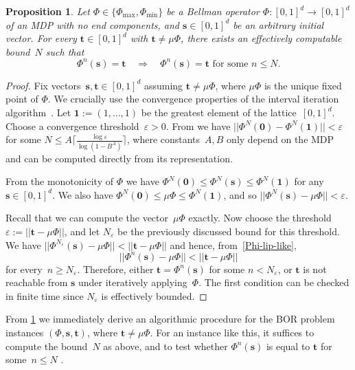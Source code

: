 \documentclass[preprint,12pt]{elsarticle}
\theoremstyle{plain}
\newtheorem{proposition}[theorem]{Proposition}
\theoremstyle{definition}
\theoremstyle{remark}
\theoremstyle{claimstyle}
\begin{document}
\begin{proposition}\label{t-not-fp}
	Let $\Phi \in \{\Phi_{\max}, \Phi_{\min}\}$
	be a Bellman operator
	$\Phi : [0, 1]^d\rightarrow [0, 1]^d$
	of an MDP with no end components, and $\bm{s} \in [0,1]^d$ be an arbitrary initial vector.
	For every $\bm{t} \in [0,1]^d$ with $\bm{t} \neq \mu\Phi$, 
	there exists an effectively computable bound~$N$ such that
	\[\Phi^n(\bm{s}) = \bm{t} \quad \Rightarrow \quad \Phi^n(\bm{s}) = \bm{t} \text{ for some } n\leq N.\]
\end{proposition}
\begin{proof}
	Fix vectors~$\bm{s}, \bm{t} \in [0,1]^d$ assuming $\bm{t} \neq \mu\Phi$, where $\mu\Phi$ is the unique fixed point of $\Phi$.
	We crucially use the convergence properties of the interval iteration algorithm~\cite{HaddadM18}.
	Let $\bm{1}:= (1, \dots, 1)$ be the greatest element of the lattice~$[0, 1]^d$. 
	Choose a convergence threshold~$\varepsilon > 0$.
	From \cite[Theorem~2]{HaddadM18} we have $||\Phi^N(\bm{0}) - \Phi^N(\bm{1})|| < \varepsilon$ for some $N \leq A \lceil \frac{\log{\varepsilon}}{\log(1-B^A)} \rceil$,
	where constants~$A, B$ only depend on the MDP and can be computed directly from its representation.
	
	From the monotonicity of $\Phi$ we have $\Phi^N(\bm{0}) \leq \Phi^N(\bm{s}) \leq \Phi^N(\bm{1})$ for any~$\bm{s} \in [0,1]^d$.
	We also have $\Phi^N(\bm{0}) \leq \mu\Phi \leq \Phi^N(\bm{1})$, 
	and so %
	$||\Phi^N(\bm{s}) - \mu\Phi|| < \varepsilon$.

Recall that we can compute the vector~$\mu\Phi$ exactly.
Now choose the threshold $\varepsilon := ||\bm{t} - \mu\Phi||$, and let $N_\varepsilon$ be the previously discussed bound for this threshold.
We have $||\Phi^{N_\varepsilon}(\bm{s}) - \mu\Phi|| <  ||\bm{t} - \mu\Phi||$  and hence, from~\cref{Phi-lip-like},
\[||\Phi^n(\bm{s}) - \mu\Phi|| <  ||\bm{t} - \mu\Phi||\]
for every~$n \geq N_\varepsilon$.
Therefore, either $\bm{t} = \Phi^n(\bm{s})$ for some $n < N_\varepsilon$, or $\bm{t}$ is not reachable from $\bm{s}$ under iteratively applying~$\Phi$.
The first condition can be checked in finite time %
since $N_{\varepsilon}$ is effectively bounded.
\end{proof}

From \cref{t-not-fp} we immediately derive an algorithmic procedure for the BOR problem instances $(\Phi, \bm{s}, \bm{t})$, where $\bm{t} \neq \mu\Phi$. 
For an instance like this, it suffices to compute the bound~$N$ as above, and to test whether $\Phi^n(\bm{s})$ is equal to $\bm{t}$ for some~$n\leq N$ .
\end{document}
